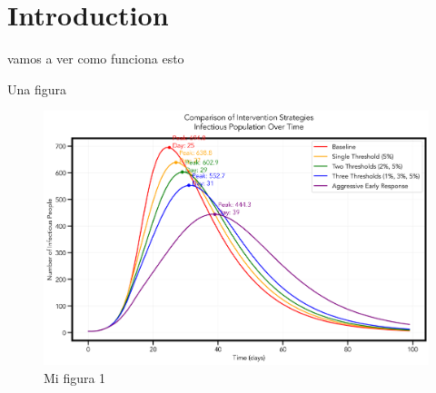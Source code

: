 \section{Introduction}

vamos a ver como funciona esto

Una figura

\begin{figure}[htb]
\centering
\includegraphics[width=1.0\textwidth]{./images/seir_comparison.png}
\caption{Mi figura 1}
\label{fig:seir1}
\end{figure}

